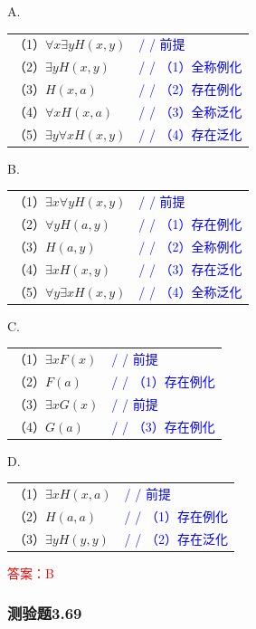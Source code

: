 \documentclass[UTF8, heading=true]{ctexart}
\begin{document}
A.

\begin{tabular}{ll}
  （1）$\forall x \exists y H(x, y)$ & \textcolor{blue}{/ / 前提} \\
  （2）$\exists y H(x, y)$ & \textcolor{blue}{/ / （1）全称例化} \\
  （3）$H(x, a)$ & \textcolor{blue}{/ / （2）存在例化} \\
  （4）$\forall x H(x, a)$ & \textcolor{blue}{/ / （3）全称泛化} \\
  （5）$\exists y \forall x H(x, y)$ & \textcolor{blue}{/ / （4）存在泛化}
\end{tabular}

B.

\begin{tabular}{ll}
  （1）$\exists x \forall y H(x, y)$ & \textcolor{blue}{/ / 前提} \\
  （2）$\forall y H(a, y)$ & \textcolor{blue}{/ / （1）存在例化} \\
  （3）$H(a, y)$ & \textcolor{blue}{/ / （2）全称例化} \\
  （4）$\exists x H(x, y)$ & \textcolor{blue}{/ / （3）存在泛化} \\
  （5）$\forall y \exists x H(x, y)$ & \textcolor{blue}{/ / （4）全称泛化}
\end{tabular}

C.

\begin{tabular}{ll}
  （1）$\exists x F(x)$ & \textcolor{blue}{/ / 前提} \\
  （2）$F(a)$ & \textcolor{blue}{/ / （1）存在例化} \\
  （3）$\exists x G(x)$ & \textcolor{blue}{/ / 前提} \\
  （4）$G(a)$ & \textcolor{blue}{/ / （3）存在例化}
\end{tabular}

D.

\begin{tabular}{ll}
  （1）$\exists x H(x, a)$ & \textcolor{blue}{/ / 前提} \\
  （2）$H(a, a)$ & \textcolor{blue}{/ / （1）存在例化} \\
  （3）$\exists y H(y, y)$ & \textcolor{blue}{/ / （2）存在泛化}
\end{tabular}

\textcolor{red}{答案：B}

\subsubsection{测验题3.69}
\end{document}
